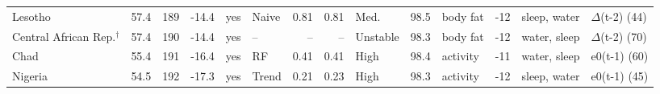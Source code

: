 {\begin{longtable}{l r r r c l r r l r l r l l}
Lesotho & 57.4 & 189 & -14.4 & yes & Naive & 0.81 & 0.81 & Med. & 98.5 & body fat & -12 & sleep, water & $\Delta$(t-2) (44) \\
Central African Rep.$^\dagger$ & 57.4 & 190 & -14.4 & yes & -- & -- & -- & Unstable & 98.3 & body fat & -12 & water, sleep & $\Delta$(t-2) (70) \\
Chad & 55.4 & 191 & -16.4 & yes & RF & 0.41 & 0.41 & High & 98.4 & activity & -11 & water, sleep & e0(t-1) (60) \\
Nigeria & 54.5 & 192 & -17.3 & yes & Trend & 0.21 & 0.23 & High & 98.3 & activity & -12 & sleep, water & e0(t-1) (45) \\
\end{longtable}}
